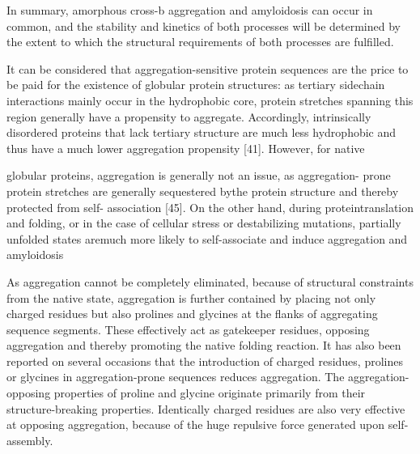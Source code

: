 In summary, amorphous cross-b aggregation and amyloidosis can occur in common, and the stability and kinetics of both processes will be determined by the extent to which the structural requirements of both processes are fulfilled.


It can be considered that aggregation-sensitive protein sequences are the price to be paid for the existence of globular protein structures: as tertiary sidechain interactions mainly occur in the hydrophobic core, protein stretches spanning this region generally have a propensity to aggregate. Accordingly, intrinsically disordered proteins that lack tertiary structure are much less hydrophobic and thus have a much lower aggregation propensity [41]. However, for native 

globular proteins, aggregation is generally not an issue, as aggregation- prone protein stretches are generally sequestered bythe protein structure and thereby protected from self-
association [45]. On the other hand, during proteintranslation and folding, or in the case of cellular stress or destabilizing mutations, partially unfolded states aremuch more likely to self-associate and induce aggregation and amyloidosis



As aggregation cannot be completely eliminated, because of structural constraints from the native state, aggregation is further contained by placing not only charged residues but also prolines and glycines at the flanks of aggregating sequence segments. These effectively act as gatekeeper residues, opposing aggregation and thereby promoting the native folding reaction. It has also been reported on several occasions that the introduction of charged residues, prolines or glycines in aggregation-prone sequences reduces aggregation.
The aggregation-opposing properties of proline and glycine originate primarily from their
structure-breaking properties. Identically charged residues are also very effective at opposing aggregation, because of the huge repulsive force generated upon self-assembly.




